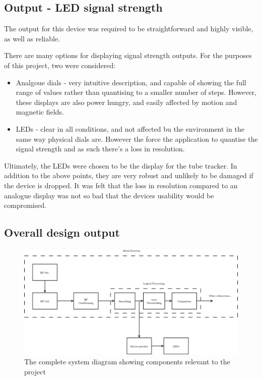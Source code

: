 \documentclass[a4paper]{article}
\begin{document}
        \subsection{Output - LED signal strength}
        The output for this device was required to be straightforward and highly visible, as well as reliable.

        There are many options for displaying signal strength outputs. For the purposes of this project, two were considered:
        \begin{itemize}
            \item Analgoue dials - very intuitive description, and capable of showing the full range of values rather than quantising to a smaller number of steps. However, these displays are also power hungry, and easily affected by motion and magnetic fields.
            \item LEDs - clear in all conditions, and not affected bu the environment in the same way physical dials are. However the force the application to quantise the signal strength and as such there's a loss in resolution.
        \end{itemize}

        Ultimately, the LEDs were chosen to be the display for the tube tracker. In addition to the above points, they are very robust and unlikely to be damaged if the device is dropped. It was felt that the loss in resolution compared to an analogue display was not so bad that the devices usability would be compromised.

        \subsection{Overall design output}
        \begin{figure}[h]
            \centering
            \includegraphics[width=\textwidth]{images/complete.png}
            \caption{The complete system diagram showing components relevant to the project}
        \end{figure}
\end{document}
